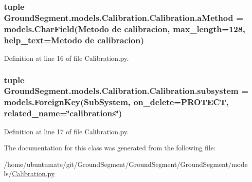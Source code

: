 \subsubsection[{a\+Method}]{\setlength{\rightskip}{0pt plus 5cm}tuple Ground\+Segment.\+models.\+Calibration.\+Calibration.\+a\+Method = models.\+Char\+Field(\textquotesingle{}Metodo de calibracion\textquotesingle{}, max\+\_\+length=128, help\+\_\+text=\textquotesingle{}Metodo de calibracion\textquotesingle{})\hspace{0.3cm}{\ttfamily [static]}}\label{class_ground_segment_1_1models_1_1_calibration_1_1_calibration_a21907a5967e76dc6d5a01ab955ac2578}


Definition at line 16 of file Calibration.\+py.

\hypertarget{class_ground_segment_1_1models_1_1_calibration_1_1_calibration_a918e0918ca8a76ecd5ed1adb9efbc043}{}
\subsubsection[{subsystem}]{\setlength{\rightskip}{0pt plus 5cm}tuple Ground\+Segment.\+models.\+Calibration.\+Calibration.\+subsystem = models.\+Foreign\+Key({\bf Sub\+System}, on\+\_\+delete=P\+R\+O\+T\+E\+C\+T, related\+\_\+name=\char`\"{}calibrations\char`\"{})\hspace{0.3cm}{\ttfamily [static]}}\label{class_ground_segment_1_1models_1_1_calibration_1_1_calibration_a918e0918ca8a76ecd5ed1adb9efbc043}


Definition at line 17 of file Calibration.\+py.



The documentation for this class was generated from the following file\+:\begin{DoxyCompactItemize}
\item 
/home/ubuntumate/git/\+Ground\+Segment/\+Ground\+Segment/\+Ground\+Segment/models/\hyperlink{_calibration_8py}{Calibration.\+py}\end{DoxyCompactItemize}
